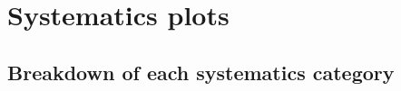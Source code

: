 \chapter{Systematics plots}
\label{Ap:Systematics}
 
\section{Breakdown of each systematics category}